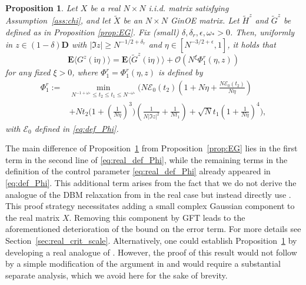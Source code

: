\documentclass[10pt]{amsart}
\newtheorem{proposition}[theorem]{Proposition}
\numberwithin{equation}{section}
\newcommand{\E}{\mathbf{E}}
\newcommand{\ii}{\mathrm{i}}
\begin{document}
\begin{proposition}\label{prop:real_EG} Let $X$ be a real $N\times N$ i.i.d. matrix satisfying Assumption~\ref{ass:chi}, and let $\widetilde{X}$ be an $N\times N$ GinOE matrix. Let $\widetilde{H}^z$ and $\widetilde{G}^z$ be defined as in Proposition \ref{prop:EG}. Fix (small) $\delta,\delta_r,\epsilon, \omega_*>0$. Then, uniformly in $z\in (1-\delta)\mathbf{D}$ with $|\Im z|\ge N^{-1/2+\delta_r}$ and $\eta\in [N^{-3/2+\epsilon},1]$, it holds that 
\begin{equation}
\E\langle G^z(\ii\eta)\rangle = \E \langle \widetilde{G}^z(\ii\eta)\rangle + \mathcal{O}(N^\xi\Phi_1^r(\eta,z))
\label{eq:real_EG_comp}
\end{equation}
for any fixed $\xi>0$, where $\Phi_1^r=\Phi_1^r(\eta,z)$ is defined by
\begin{equation}
\begin{split}
\Phi_1^r:=&\min_{N^{-1+\omega_*}\le t_2\le t_1\le N^{-\omega_*}}\bigg(N\mathcal{E}_0(t_2)\left(1+N\eta + \frac{N\mathcal{E}_0(t_2)}{N\eta}\right)\\
 &+Nt_2\bigg(1+\left(\frac{1}{N\eta}\right)^3\bigg)\left(\frac{1}{N|\Im z|^2} +\frac{1}{Nt_1}\right) +\sqrt{N}t_1\left(1+\frac{1}{N\eta}\right)^4\bigg),
\end{split}
\label{eq:real_def_Phi}
\end{equation}
with $\mathcal{E}_0$ defined in \eqref{eq:def_Phi}.
\end{proposition}

The main difference of Proposition~\ref{prop:real_EG} from Proposition~\ref{prop:EG} lies in the first term in the second line of \eqref{eq:real_def_Phi}, while the remaining terms in the definition of the control parameter \eqref{eq:real_def_Phi} already appeared in \eqref{eq:def_Phi}. This additional term arises from the fact that we do not derive the analogue of the DBM relaxation from \cite[Proposition~4.6]{bourgade2024fluctuations} in the real case but instead directly use \cite[Proposition~4.6]{bourgade2024fluctuations}. This proof strategy necessitates adding a small complex Gaussian component to the real matrix $X$. Removing this component by GFT leads to the aforementioned deterioration of the bound on the error term. For more details see Section~\ref{sec:real_crit_scale}. Alternatively, one could establish Proposition~\ref{prop:real_EG} by developing a real analogue of \cite[Proposition~4.6]{bourgade2024fluctuations}. However, the proof of this result would not follow by a simple modification of the argument in \cite{bourgade2024fluctuations} and would require a substantial separate analysis, which we avoid here for the sake of brevity.
\end{document}
